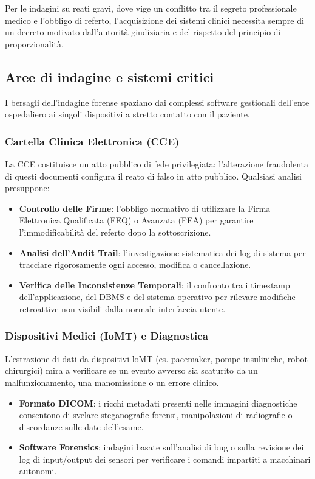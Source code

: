 \documentclass[11pt,a4paper]{article}
\begin{document}
Per le indagini su reati gravi, dove vige un conflitto tra il segreto professionale medico e l'obbligo di referto, l'acquisizione dei sistemi clinici necessita sempre di un decreto motivato dall'autorità giudiziaria e del rispetto del principio di proporzionalità.

\subsection{Aree di indagine e sistemi critici}
I bersagli dell'indagine forense spaziano dai complessi software gestionali dell'ente ospedaliero ai singoli dispositivi a stretto contatto con il paziente.

\subsubsection{Cartella Clinica Elettronica (CCE)}
La CCE costituisce un atto pubblico di fede privilegiata: l'alterazione fraudolenta di questi documenti configura il reato di falso in atto pubblico. 
Qualsiasi analisi presuppone:
\begin{itemize}
    \item \textbf{Controllo delle Firme}: l'obbligo normativo di utilizzare la Firma Elettronica Qualificata (FEQ) o Avanzata (FEA) per garantire l'immodificabilità del referto dopo la sottoscrizione.
    \item \textbf{Analisi dell'Audit Trail}: l'investigazione sistematica dei log di sistema per tracciare rigorosamente ogni accesso, modifica o cancellazione.
    \item \textbf{Verifica delle Inconsistenze Temporali}: il confronto tra i timestamp dell'applicazione, del DBMS e del sistema operativo per rilevare modifiche retroattive non visibili dalla normale interfaccia utente.
\end{itemize}

\subsubsection{Dispositivi Medici (IoMT) e Diagnostica}
L'estrazione di dati da dispositivi loMT (es. pacemaker, pompe insuliniche, robot chirurgici) mira a verificare se un evento avverso sia scaturito da un malfunzionamento, una manomissione o un errore clinico.
\begin{itemize}
    \item \textbf{Formato DICOM}: i ricchi metadati presenti nelle immagini diagnostiche consentono di svelare steganografie forensi, manipolazioni di radiografie o discordanze sulle date dell'esame.
    \item \textbf{Software Forensics}: indagini basate sull'analisi di bug o sulla revisione dei log di input/output dei sensori per verificare i comandi impartiti a macchinari autonomi.
\end{itemize}
\end{document}
